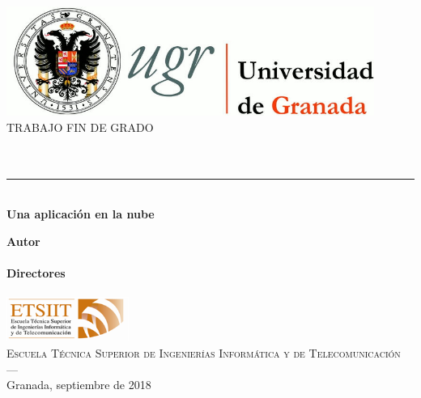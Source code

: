 \begin{titlepage}
 
 

\newlength{\centeroffset}
\setlength{\centeroffset}{-0.5\oddsidemargin}
\addtolength{\centeroffset}{0.5\evensidemargin}
\thispagestyle{empty}

\noindent\hspace*{\centeroffset}\begin{minipage}{\textwidth}

\centering
\includegraphics[width=0.9\textwidth]{imagenes/logo_ugr.jpg}\\[1.4cm]

\textsc{ \Large TRABAJO FIN DE GRADO\\[0.2cm]}
\textsc{ \myDegree}\\[1cm]
% 
{\Huge\bfseries \myTitle\\
}
\noindent\rule[-1ex]{\textwidth}{3pt}\\[3.5ex]
{\large\bfseries Una aplicación en la nube}
\end{minipage}

\vspace{2.5cm}
\noindent\hspace*{\centeroffset}\begin{minipage}{\textwidth}
\centering

\textbf{Autor}\\ {\myName}\\[2.5cm]
\textbf{Directores}\\\myProf\\[2cm]
\includegraphics[width=0.3\textwidth]{imagenes/etsiit_logo.png}\\[0.1cm]
\textsc{Escuela Técnica Superior de Ingenierías Informática y de Telecomunicación}\\
\textsc{---}\\
Granada, septiembre de 2018
\end{minipage}
\end{titlepage}


